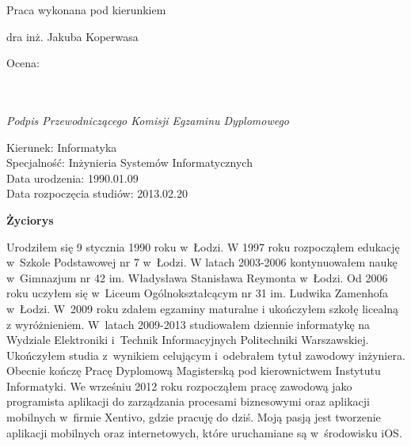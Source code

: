\begin{titlepage}
 \vspace{3cm}
 
 \hfill Praca wykonana pod kierunkiem
 
 \hfill dra inż. Jakuba Koperwasa
 
 \vspace{3cm}

 \begin{flushleft}
  \begin{minipage}{7cm}
   Ocena: \dotfill \\ \\
   \hspace*{0cm} \dotfill \\[-0.7cm]
   \begin{center}
    \small\textit{Podpis Przewodniczącego Komisji Egzaminu Dyplomowego}
   \end{center}
  \end{minipage}
 \end{flushleft}

\end{titlepage}


\newpage
\thispagestyle{empty}

\begin{flushright}
  Kierunek: Informatyka \\
  Specjalność: Inżynieria Systemów Informatycznych \\
  Data urodzenia: 1990.01.09 \\
  Data rozpoczęcia studiów: 2013.02.20 \\
\end{flushright}

\vspace*{3cm}

\begin{center}
  \textbf{\textbf{Życiorys}}
\end{center}
 
\vspace{1cm}

Urodziłem się 9 stycznia 1990 roku w~Łodzi. W 1997 roku rozpocząłem edukację w~Szkole Podstawowej nr 7 w~Łodzi. W latach 2003-2006 kontynuowałem naukę w~Gimnazjum nr 42 im. Władysława Stanisława Reymonta w~Łodzi. Od 2006 roku uczyłem się w~Liceum Ogólnokształcącym nr 31 im. Ludwika Zamenhofa w~Łodzi. W~2009 roku zdałem egzaminy maturalne i ukończyłem szkołę licealną z wyróżnieniem. W~latach 2009-2013 studiowałem dziennie informatykę na Wydziale Elektroniki i~Technik Informacyjnych Politechniki Warszawskiej. Ukończyłem studia z~wynikiem celującym i~odebrałem tytuł zawodowy inżyniera. Obecnie kończę Pracę Dyplomową Magisterską pod kierownictwem Instytutu Informatyki. We wrześniu 2012 roku rozpocząłem pracę zawodową jako programista aplikacji do zarządzania procesami biznesowymi oraz aplikacji mobilnych w~firmie Xentivo, gdzie pracuję do dziś. Moją pasją jest tworzenie aplikacji mobilnych oraz internetowych, które uruchamiane są w~środowisku iOS.

